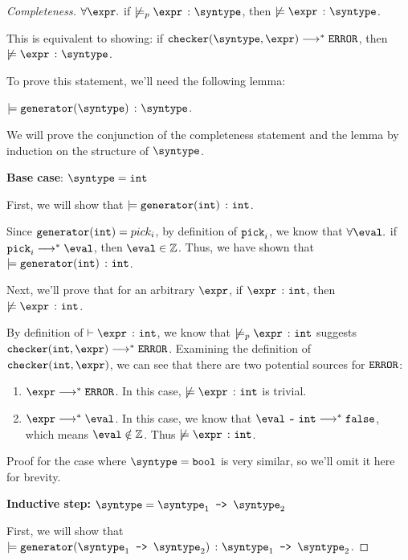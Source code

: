 \begin{proof}[Completeness]
  $\forall \expr.$ if $\not\models_p \hastype{\expr}{\syntype}$, then $\not\models \hastype{\expr}{\syntype}$.

  This is equivalent to showing: if $\mkche{\syntype}{\expr} \smallsteps[] \eerror$, then $\not\models \hastype{\expr}{\syntype}$.

  To prove this statement, we'll need the following lemma:

  \begin{lemma}
    $\models \hastype{\mkgen{\syntype}}{\syntype}$.
  \end{lemma}

  We will prove the conjunction of the completeness statement and the lemma by induction on the structure of $\syntype$.

  \textbf{Base case}: $\syntype = \tint$

  First, we will show that $\models \texttt{generator}(\texttt{int})\ \colon \texttt{int}$.
  
  Since $\texttt{generator}(\texttt{int}) = pick_i$, by definition of $\texttt{pick}_i$, we know that $\forall \eval.$ if $\pick_i \smallsteps[] \eval$, then $\eval \in \mathbb{Z}$. Thus, we have shown that $\models \texttt{generator}(\texttt{int})\ \colon \texttt{int}$.

  Next, we'll prove that for an arbitrary $\expr$, if $ \hastype{\expr}{\tint}$, then $\not\models \hastype{\expr}{\tint}$.

  By definition of $\vdash \hastype{\expr}{\tint}$, we know that $\not\models_p \hastype{\expr}{\tint}$ suggests $\mkche{\tint}{\expr} \smallsteps[] \eerror$. Examining the definition of $\mkche{\tint}{\expr}$, we can see that there are two potential sources for $\texttt{ERROR}$:
  \begin{enumerate}
    \item $\expr \smallsteps[] \eerror$. In this case, $\not\models \hastype{\expr}{\tint}$ is trivial. 
    \item $\expr \smallsteps[] \eval$. In this case, we know that $\matches{\eval}{\tint} \smallsteps[] \texttt{false}$, which means $\eval \notin \mathbb{Z}$. Thus $\not\models \hastype{\expr}{\tint}$. 
  \end{enumerate}

  Proof for the case where $\syntype = \tbool$ is very similar, so we'll omit it here for brevity.

  \textbf{Inductive step:} $\syntype = \mkfun{\syntype_1}{\syntype_2}$

  First, we will show that $\models \hastype{\mkgen{\mkfun{\syntype_1}{\syntype_2}}}{\mkfun{\syntype_1}{\syntype_2}}$.


\end{proof}
